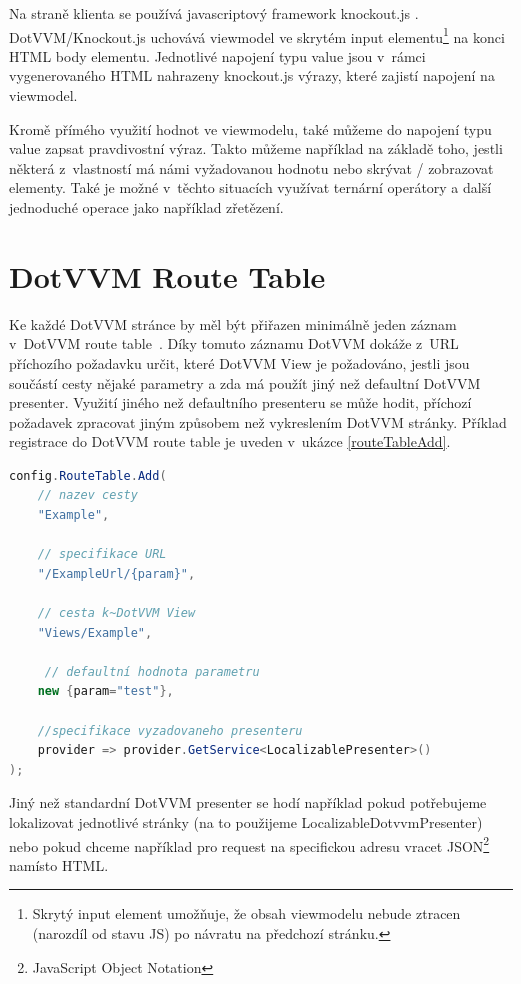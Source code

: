 Na straně klienta se používá javascriptový framework knockout.js . DotVVM/Knockout.js uchovává viewmodel ve skrytém input elementu\footnote{Skrytý input element umožňuje, že obsah viewmodelu nebude ztracen (narozdíl od stavu JS) po návratu na předchozí stránku.} na konci HTML body elementu. Jednotlivé napojení typu value jsou v~rámci vygenerovaného HTML nahrazeny knockout.js výrazy, které zajistí napojení na viewmodel.

Kromě přímého využití hodnot ve viewmodelu, také můžeme do napojení typu value zapsat pravdivostní výraz. Takto můžeme například na základě toho, jestli některá z~vlastností má námi vyžadovanou hodnotu nebo skrývat / zobrazovat elementy. Také je možné v~těchto situacích využívat ternární operátory a další jednoduché operace jako například zřetězení. 
\section{DotVVM Route Table}
Ke každé DotVVM stránce by měl být přiřazen minimálně jeden záznam v~DotVVM route table~\cite{DotVVM-Routing}. Díky tomuto záznamu DotVVM dokáže z~URL příchozího požadavku určit, které DotVVM View je požadováno, jestli jsou součástí cesty nějaké parametry a zda má použít jiný než defaultní DotVVM presenter. Využití jiného než defaultního presenteru se může hodit, příchozí požadavek zpracovat jiným způsobem než vykreslením DotVVM stránky. Příklad registrace do DotVVM route table je uveden v~ukázce \ref{routeTableAdd}.
\begin{lstlisting}[language=C#, caption=Ukázka přidání záznamu do DotVVM route table v~rámci DotvvmStartup.cs.,label=routeTableAdd,captionpos=t]
config.RouteTable.Add(
    // nazev cesty
    "Example",
    
    // specifikace URL
    "/ExampleUrl/{param}",
    
    // cesta k~DotVVM View
    "Views/Example", 
    
     // defaultní hodnota parametru
    new {param="test"},
    
    //specifikace vyzadovaneho presenteru
    provider => provider.GetService<LocalizablePresenter>()
);
\end{lstlisting}

Jiný než standardní DotVVM presenter se hodí například pokud potřebujeme lokalizovat jednotlivé stránky (na to použijeme LocalizableDotvvmPresenter) nebo pokud chceme například pro request na specifickou adresu vracet JSON\footnote{JavaScript Object Notation} namísto HTML.
